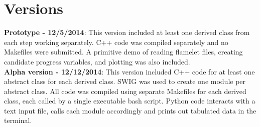 \documentclass[11pt]{article}
\begin{document}
\section{Versions}
\textbf{Prototype - 12/5/2014}: This version included at least one derived class from each step working separately. C++ code was compiled separately and no Makefiles were submitted. A primitive demo of reading flamelet files, creating candidate progress variables, and plotting was also included.
\\
\textbf{Alpha version - 12/12/2014}: This version included C++ code for at least one abstract class for each derived class. SWIG was used to create one module per abstract class. All code was compiled using separate Makefiles for each derived class, each called by a single executable bash script. Python code interacts with a text input file, calls each module accordingly and prints out tabulated data in the terminal.
\end{document}
